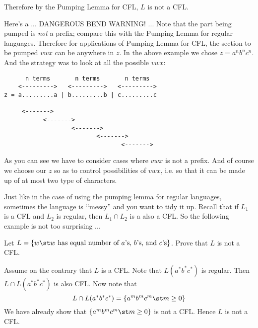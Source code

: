 Therefore by the Pumping Lemma for CFL, $L$ is not a CFL. 

Here's a ... DANGEROUS BEND WARNING! ...
Note that the part being pumped is \textit{not} a prefix;
compare this with the Pumping Lemma for regular languages.
Therefore for applications of Pumping Lemma for CFL, the section to be pumped
$vwx$ can be anywhere in $z$.
In the above example we chose $z = a^n b^n c^n$.
And the strategy was to look at all the possible $vwx$:
\begin{verbatim}
      n terms       n terms       n terms
    <--------->   <--------->   <--------->
z = a.........a | b.........b | c.........c

     <------->
           <------->
                   <------->
                          <------->
                                 <------->
\end{verbatim}

As you can see we have to consider cases where $vwx$ is not a prefix.
And of course we choose our $z$ so as to control possibilities of $vwx$, i.e.
so that it can be made up of at most two type of characters.


















\newpage
Just like in the case of using the pumping lemma for regular languages, 
sometimes the language is \lq\lq messy'' and you want to tidy it up.
Recall that if $L_1$ is a CFL and $L_2$ is regular,
then $L_1 \cap L_2$ is a also a CFL.
So the following example is not too surprising ...



\begin{eg}
Let $L = \{w \st w \text{ has equal number of $a$'s, $b$'s, and $c$'s} \}$.
Prove that $L$ is not a CFL.
\end{eg}

\SOLUTION
Assume on the contrary that $L$ is a CFL.
Note that $L(a^*b^*c^*)$ is regular.
Then $L \cap L(a^*b^*c^*)$ is also CFL.
Now note that
\[
L \cap L(a^*b^*c^*) 
= \{a^m b^m c^m \st m \geq 0 \}
\]
We have already show that $\{a^m b^m c^m \st m \geq 0 \}$
is not a CFL.
Hence $L$ is not a CFL.

